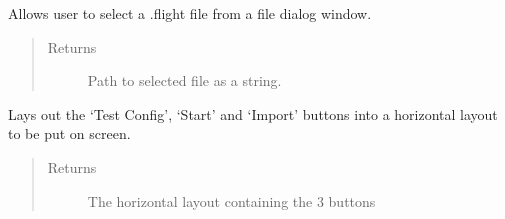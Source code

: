 \documentclass[letterpaper,10pt,english]{sphinxmanual}
\begin{document}
\begin{fulllineitems}
\begin{fulllineitems}
\begin{quote}
\begin{description}
\end{description}\end{quote}

\end{fulllineitems}


\begin{fulllineitems}
\label{\detokenize{index:src.Views.View_StartupScreen.StartupWindow.openFileNameDialog}}
Allows user to select a .flight file from a file dialog window.
\begin{quote}\begin{description}
\item[{Returns}] \leavevmode
Path to selected file as a string.

\end{description}\end{quote}

\end{fulllineitems}


\begin{fulllineitems}
\label{\detokenize{index:src.Views.View_StartupScreen.StartupWindow.setButtonLayout}}
Lays out the ‘Test Config’, ‘Start’ and ‘Import’ buttons into a horizontal layout to be
put on screen.
\begin{quote}\begin{description}
\item[{Returns}] \leavevmode
The horizontal layout containing the 3 buttons

\end{description}\end{quote}

\end{fulllineitems}



\end{fulllineitems}
\end{document}
